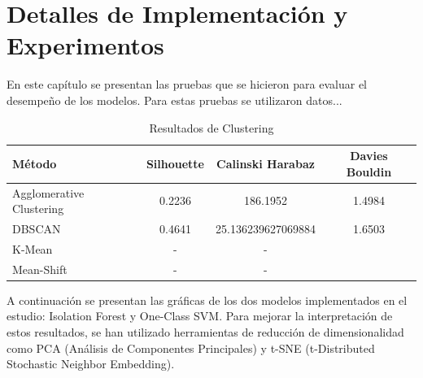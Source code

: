 \chapter{Detalles de Implementación y Experimentos}\label{chapter:implementation}

En este capítulo se presentan las pruebas que se hicieron para evaluar
 el desempeño de los modelos. Para estas pruebas se utilizaron datos...

\begin{table}[ht]
    \centering
    \caption{Resultados de Clustering}
    \begin{tabular}{lccc}
        \toprule
        \textbf{Método} & \textbf{Silhouette} & \textbf{Calinski Harabaz} & \textbf{Davies Bouldin} \\
        \midrule
        Agglomerative Clustering & 0.2236 & 186.1952 & 1.4984 \\
        DBSCAN & 0.4641 & 25.136239627069884 & 1.6503 \\
        K-Mean & - & - & \\
        Mean-Shift & - & - &
        \bottomrule
    \end{tabular}
\end{table}

A continuación se presentan las gráficas de los dos modelos implementados en el estudio: Isolation Forest y One-Class SVM. Para mejorar la interpretación de estos resultados, se han utilizado herramientas de reducción de dimensionalidad como PCA (Análisis de Componentes Principales) y t-SNE (t-Distributed Stochastic Neighbor Embedding).\\

